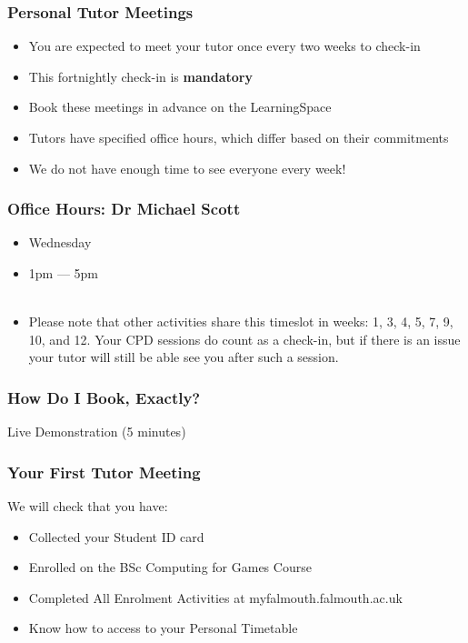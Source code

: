 \begin{frame}
	\frametitle{Personal Tutor Meetings}	
	\begin{itemize}
		\item You are expected to meet your tutor once every two weeks to check-in
		\item This fortnightly check-in is \textbf{mandatory}
		\item Book these meetings in advance on the LearningSpace
		
		\item Tutors have specified office hours, which differ based on their commitments
		\item We do not have enough time to see everyone every week! 
	\end{itemize}
\end{frame}

\begin{frame}
	\frametitle{Office Hours: Dr Michael Scott}	
	\begin{itemize}
		\item Wednesday
		\item 1pm --- 5pm
		\\~\\
		\item Please note that other activities share this timeslot in weeks: 1, 3, 4, 5, 7, 9, 10, and 12. Your CPD sessions do count as a check-in, but if there is an issue your tutor will still be able see you after such a session.
	\end{itemize}
\end{frame}

\begin{frame}
	\frametitle{How Do I Book, Exactly?}	
	\begin{center}
		Live Demonstration (5 minutes)
	\end{center}
\end{frame}

\begin{frame}
	\frametitle{Your First Tutor Meeting}	
	
	We will check that you have:
	
	\begin{itemize}
	\item Collected your Student ID card
	\item Enrolled on the BSc Computing for Games Course
	\item Completed All Enrolment Activities at myfalmouth.falmouth.ac.uk
	\item Know how to access to your Personal Timetable
	\end{itemize}
\end{frame}

